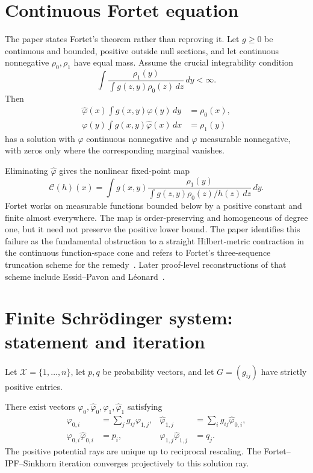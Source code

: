 \section{Continuous Fortet equation}
The paper states Fortet's theorem rather than reproving it.  Let $g\ge0$ be continuous and bounded,
positive outside null sections, and let continuous nonnegative $\rho_0,\rho_1$ have equal mass.
Assume the crucial integrability condition
\[
 \int\frac{\rho_1(y)}{\int g(z,y)\rho_0(z)\,dz}\,dy<\infty.
\]
Then
\begin{align*}
 \widehat\varphi(x)\int g(x,y)\varphi(y)\,dy&=\rho_0(x),\\
 \varphi(y)\int g(x,y)\widehat\varphi(x)\,dx&=\rho_1(y)
\end{align*}
has a solution with $\varphi$ continuous nonnegative and $\widehat\varphi$ measurable nonnegative,
with zeros only where the corresponding marginal vanishes.

Eliminating $\widehat\varphi$ gives the nonlinear fixed-point map
\begin{equation}
 \mathcal C(h)(x)
 =\int g(x,y)
 \frac{\rho_1(y)}{\int g(z,y)\rho_0(z)/h(z)\,dz}\,dy.
 \label{eq:CGP-Fortet-map}
\end{equation}
Fortet works on measurable functions bounded below by a positive constant and finite almost
everywhere.  The map is order-preserving and homogeneous of degree one, but it need not preserve
the positive lower bound.  The paper identifies this failure as the fundamental obstruction to a
straight Hilbert-metric contraction in the continuous function-space cone and refers to Fortet's three-sequence truncation scheme for the remedy~\cite{Fortet1940}.  Later
proof-level reconstructions of that scheme include Essid--Pavon and L\'eonard~\cite{EssidPavon2019,Leonard2019}.

\section{Finite Schr\"odinger system: statement and iteration}
Let $\mathcal X=\{1,\dots,n\}$, let $p,q$ be probability vectors, and let
$G=(g_{ij})$ have strictly positive entries.

\begin{theorem}\label{thm:CGP-finite}
There exist vectors
$\varphi_0,\widehat\varphi_0,\varphi_1,\widehat\varphi_1$ satisfying
\begin{align}
 \varphi_{0,i}&=\sum_jg_{ij}\varphi_{1,j},
 &\widehat\varphi_{1,j}&=\sum_ig_{ij}\widehat\varphi_{0,i},
 \label{eq:CGP-finite-linear}\\
 \varphi_{0,i}\widehat\varphi_{0,i}&=p_i,
 &\varphi_{1,j}\widehat\varphi_{1,j}&=q_j.
 \label{eq:CGP-finite-products}
\end{align}
The positive potential rays are unique up to reciprocal rescaling.
The Fortet--IPF--Sinkhorn iteration converges projectively to this solution ray.
\end{theorem}

